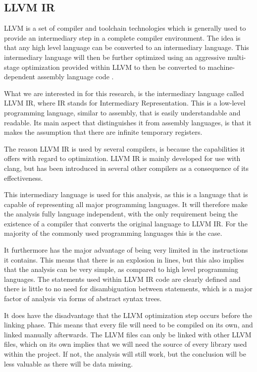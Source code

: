 \documentclass[11pt]{article}
\begin{document}
\begin{multicols}{2}
\subsection{LLVM IR}
LLVM  is a set of compiler and toolchain technologies which is generally used to provide an intermediary step in a complete compiler environment. The idea is that any high level language can be converted to an intermediary language. This intermediary language will then be further optimized using an aggressive multi-stage optimization provided within LLVM to then be converted to machine-dependent assembly language code \cite{lattner2002llvm}.

What we are interested in for this research, is the intermediary language called LLVM IR, where IR stands for Intermediary Representation. This is a low-level programming language, similar to assembly, that is easily understandable and readable. Its main aspect that distinguishes it from assembly languages, is that it makes the assumption that there are infinite temporary registers. 

The reason LLVM IR is used by several compilers, is because the capabilities it offers with regard to optimization. LLVM IR is mainly developed for use with clang, but has been introduced in several other compilers as a consequence of its effectiveness.

This intermediary language is used for this analysis, as this is a language that is capable of representing all major programming languages. It will therefore make the analysis fully language independent, with the only requirement being the existence of a compiler that converts the original language to LLVM IR. For the majority of the commonly used programming languages this is the case.

It furthermore has the major advantage of being very limited in the instructions it contains. This means that there is an explosion in lines, but this also implies that the analysis can be very simple, as compared to high level programming languages. The statements used within LLVM IR code are clearly defined and there is little to no need for disambiguation between statements, which is a major factor of analysis via forms of abstract syntax trees.

It does have the disadvantage that the LLVM optimization step occurs before the linking phase. This means that every file will need to be compiled on its own, and linked manually afterwards. The LLVM files can only be linked with other LLVM files, which on its own implies that we will need the source of every library used within the project. If not, the analysis will still work, but the conclusion will be less valuable as there will be data missing.


\end{multicols}
\end{document}
